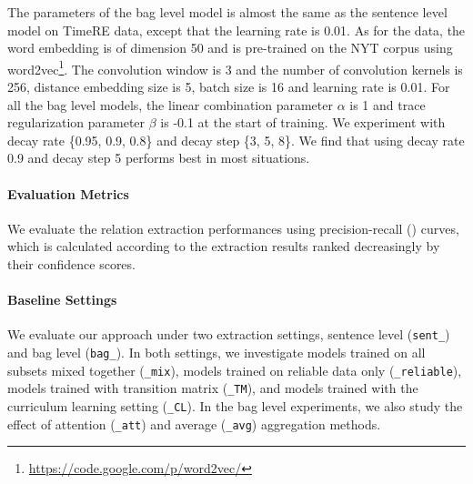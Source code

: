The parameters of the bag level model is almost the same as the sentence level model on TimeRE data, except that the learning rate is 0.01. As for the \EntityRE data, the word embedding is of dimension 50 and is pre-trained on the NYT corpus using word2vec\footnote{\url{ https://code.google.com/p/word2vec/}}. The convolution window is 3 and the number of convolution kernels is 256, distance embedding size is 5, batch size is 16 and learning rate is 0.01. For all the bag level models, the linear combination parameter $\alpha$ is 1 and trace regularization parameter $\beta$ is -0.1 at the start of training. We experiment with decay rate \{0.95, 0.9, 0.8\} and decay step \{3, 5, 8\}. We find that using decay rate 0.9 and decay step 5 performs best in most situations.

\paragraph{Evaluation Metrics}
We evaluate the relation extraction performances using precision-recall (\PR) curves, which is calculated according to the extraction results ranked decreasingly by their confidence scores.

\paragraph{Baseline Settings}
We evaluate our approach under two extraction settings, sentence level
(\texttt{sent\_}) and bag level (\texttt{bag\_}). In both settings, we
investigate models trained on all subsets mixed together (\texttt{\_mix}),
models trained on reliable data only (\texttt{\_reliable}), models trained
with transition matrix (\texttt{\_TM}), and models trained
with the curriculum learning setting  (\texttt{\_CL}). In the bag level
experiments, we also study the effect of attention (\texttt{\_att}) and
average
(\texttt{\_avg}) aggregation methods.

